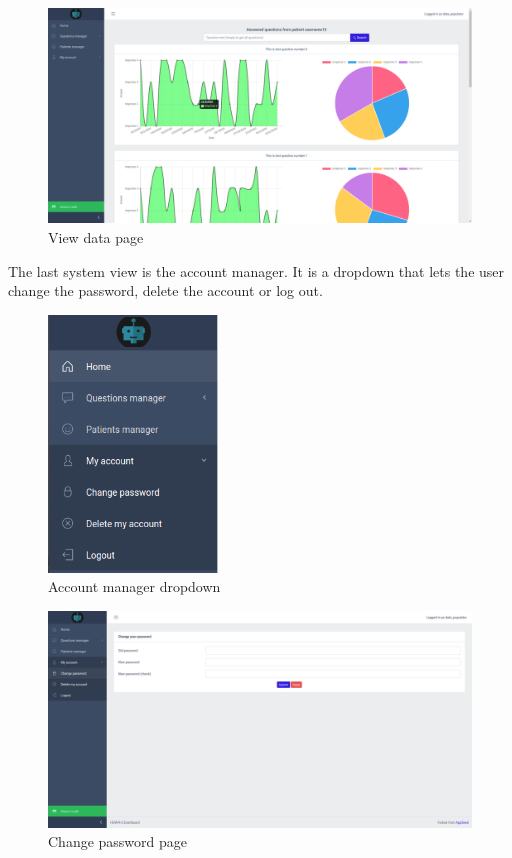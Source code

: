\documentclass[12pt,english]{article}
\begin{document}
\begin{figure}[H]
  \centering
    \includegraphics[width=\textwidth]{view_data.png}
  \caption{View data page}
\end{figure}

The last system view is the account manager. It is a dropdown that lets the user change the password, delete the account or log out.

\begin{figure}[H]
    \centering
    \includegraphics[width=0.4\textwidth]{account_dropdown.png}
    \caption{Account manager dropdown}
\end{figure}

\begin{figure}[H]
    \centering
    \includegraphics[width=\textwidth]{change_pwd.png}
    \caption{Change password page}
\end{figure}
\end{document}
